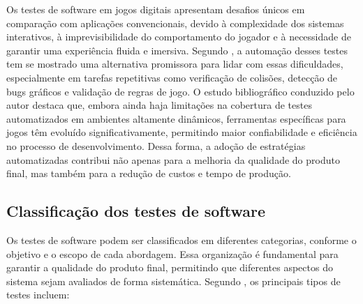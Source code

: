 Os testes de software em jogos digitais apresentam desafios únicos em comparação com aplicações convencionais, devido à complexidade dos sistemas interativos, à imprevisibilidade do comportamento do jogador e à necessidade de garantir uma experiência fluida e imersiva. Segundo , a automação desses testes tem se mostrado uma alternativa promissora para lidar com essas dificuldades, especialmente em tarefas repetitivas como verificação de colisões, detecção de bugs gráficos e validação de regras de jogo. O estudo bibliográfico conduzido pelo autor destaca que, embora ainda haja limitações na cobertura de testes automatizados em ambientes altamente dinâmicos, ferramentas específicas para jogos têm evoluído significativamente, permitindo maior confiabilidade e eficiência no processo de desenvolvimento. Dessa forma, a adoção de estratégias automatizadas contribui não apenas para a melhoria da qualidade do produto final, mas também para a redução de custos e tempo de produção.

\subsection{Classificação dos testes de software}

Os testes de software podem ser classificados em diferentes categorias, conforme o objetivo e o escopo de cada abordagem. Essa organização é fundamental para garantir a qualidade do produto final, permitindo que diferentes aspectos do sistema sejam avaliados de forma sistemática. Segundo , os principais tipos de testes incluem:

